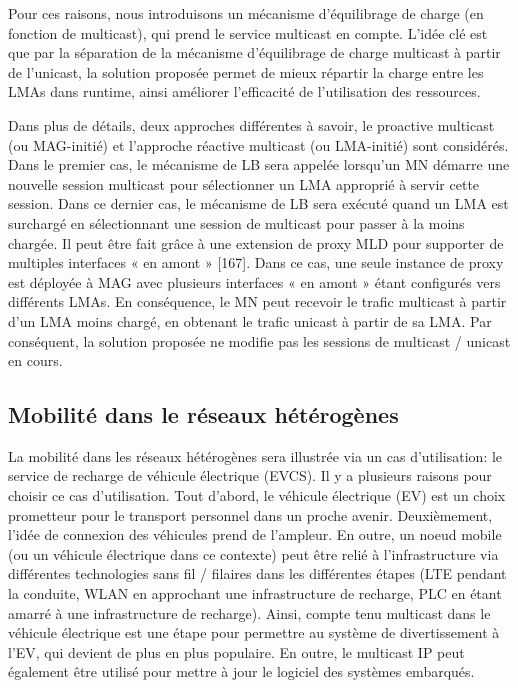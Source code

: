 Pour ces raisons, nous introduisons un mécanisme d'équilibrage de charge (en fonction de multicast), qui prend le service multicast en compte. L'idée clé est que par la séparation de la mécanisme d'équilibrage de charge multicast à partir de l'unicast, la solution proposée permet de mieux répartir la charge entre les LMAs dans runtime, ainsi améliorer l'efficacité de l'utilisation des ressources.

Dans plus de détails, deux approches différentes à savoir, le proactive multicast (ou MAG-initié) et  l'approche réactive multicast (ou LMA-initié) sont considérés. Dans le premier cas, le mécanisme de LB sera appelée lorsqu'un MN démarre une nouvelle session multicast pour sélectionner un LMA approprié à servir cette session. Dans ce dernier cas, le mécanisme de LB sera exécuté quand un LMA est surchargé en sélectionnant une session de multicast pour passer à la moins chargée. Il peut être fait grâce à une extension de proxy MLD pour supporter de multiples interfaces « en amont » [167]. Dans ce cas, une seule instance de proxy est déployée à MAG avec plusieurs interfaces « en amont » étant configurés vers différents LMAs. En conséquence, le MN peut recevoir le trafic multicast à partir d'un LMA moins chargé, en obtenant le trafic unicast à partir de sa LMA. Par conséquent, la solution proposée ne modifie pas les sessions de multicast / unicast en cours.


\subsection{Mobilité dans le réseaux hétérogènes}
La mobilité dans les réseaux hétérogènes sera illustrée via un cas d'utilisation: le service de recharge de véhicule électrique (EVCS). Il y a plusieurs raisons pour choisir ce cas d'utilisation. Tout d'abord, le véhicule électrique (EV) est un choix prometteur pour le transport personnel dans un proche avenir. Deuxièmement, l'idée de connexion des véhicules prend de l'ampleur. En outre, un noeud mobile (ou un véhicule électrique dans ce contexte) peut être relié à l'infrastructure via différentes technologies sans fil / filaires dans les différentes étapes (LTE pendant la conduite, WLAN en approchant une infrastructure de recharge, PLC en étant amarré à une infrastructure de recharge). Ainsi, compte tenu multicast dans le véhicule électrique est une étape pour permettre au système de divertissement à l'EV, qui devient de plus en plus populaire. En outre, le multicast IP peut également être utilisé pour mettre à jour le logiciel des systèmes embarqués.

